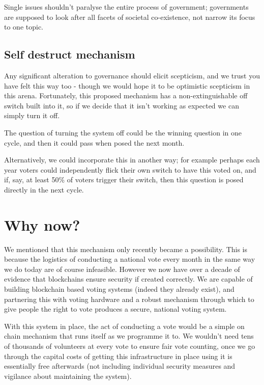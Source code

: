 \documentclass[twoside]{article}
\theoremstyle{definition}
\begin{document}
Single issues shouldn’t paralyse the entire process of government; governments are supposed to look after all facets of societal co-existence, not narrow its focus to one topic.

\subsection{Self destruct mechanism}

Any significant alteration to governance should elicit scepticism, and we trust you have felt this way too - though we would hope it to be optimistic scepticism in this arena. Fortunately, this proposed mechanism has a non-extinguishable off switch built into it, so if we decide that it isn’t working as expected we can simply turn it off.

The question of turning the system off could be the winning question in one cycle, and then it could pass when posed the next month.

Alternatively, we could incorporate this in another way; for example perhaps each year voters could independently flick their own switch to have this voted on, and if, say, at least 50\% of voters trigger their switch, then this question is posed directly in the next cycle.

\section{Why now?}

We mentioned that this mechanism only recently became a possibility. This is because the logistics of conducting a national vote every month in the same way we do today are of course infeasible. However we now have over a decade of evidence that blockchains ensure security if created correctly. We are capable of building blockchain based voting systems (indeed they already exist), and partnering this with voting hardware and a robust mechanism through which to give people the right to vote produces a secure, national voting system.

With this system in place, the act of conducting a vote would be a simple on chain mechanism that runs itself as we programme it to. We wouldn’t need tens of thousands of volunteers at every vote to ensure fair vote counting, once we go through the capital costs of getting this infrastructure in place using it is essentially free afterwards (not including individual security measures and vigilance about maintaining the system). 
\end{document}
